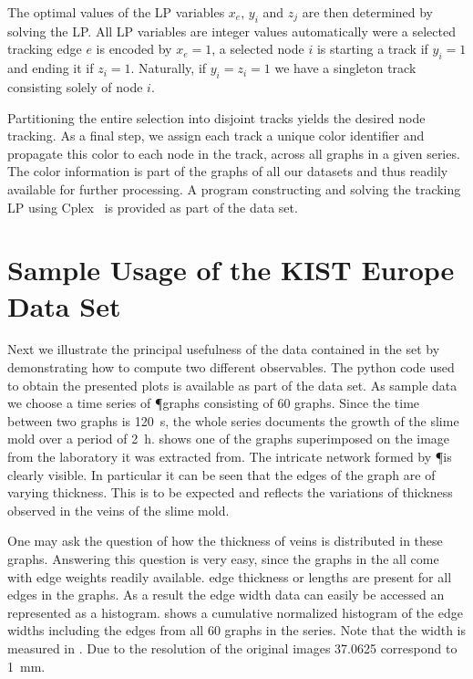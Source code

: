 		The optimal values of the LP variables $x_e$, $y_i$ and $z_j$ are then determined by solving the LP. All LP variables are integer values automatically were a selected tracking edge $e$ is encoded by $x_e=1$, a selected node $i$ is starting a track if $y_i=1$ and ending it if $z_i=1$. Naturally, if $y_i=z_i=1$ we have a singleton track consisting solely of node $i$.

		Partitioning the entire selection into disjoint tracks yields the desired node tracking. As a final step, we assign each track a unique color identifier and propagate this color to each node in the track, \ie across all graphs in a given series. The color information is part of the graphs of all our datasets and thus readily available for further processing. A program constructing and solving the tracking LP using Cplex~\cite{cplex2005high} is provided as part of the data set.

\section{Sample Usage of the KIST Europe Data Set}

	Next we illustrate the principal usefulness of the data contained in the \data set by demonstrating how to compute two different observables. The python code used to obtain the presented plots is available as part of the data set. As sample data we choose a time series of \P graphs consisting of $60$ graphs. Since the time between two graphs is \SI{120}{\second}, the whole series documents the growth of the slime mold over a period of \SI{2}{\hour}.  shows one of the graphs superimposed on the image from the laboratory it was extracted from. The intricate network formed by \P is clearly visible. In particular it can be seen that the edges of the graph are of varying thickness. This is to be expected and reflects the variations of thickness observed in the veins of the slime mold. 

	One may ask the question of how the thickness of veins is distributed in these graphs. Answering this question is very easy, since the graphs in the \data all come with edge weights readily available. \ie edge thickness or lengths are present for all edges in the graphs. As a result the edge width data can easily be accessed an represented as a histogram.  shows a cumulative normalized histogram of the edge widths including the edges from all $60$ graphs in the series. Note that the width is measured in \si{\pixel}. Due to the resolution of the original images \SI{37.0625}{\pixel} correspond to \SI{1}{\milli\metre}.

